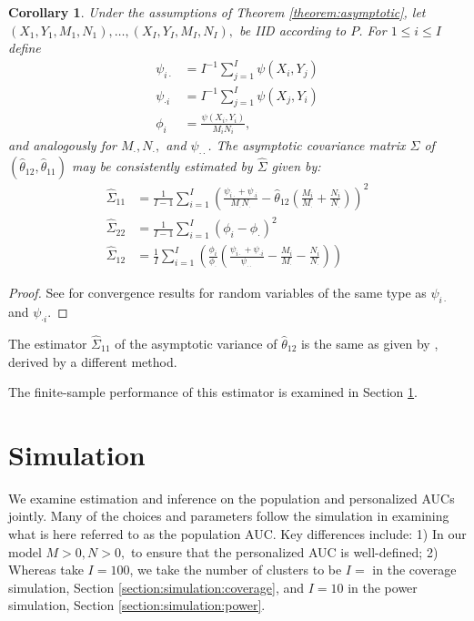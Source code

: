 \documentclass[12pt]{article}
\DeclareMathOperator{\AUC}{AUC}
\newcommand{\I}{I}
\renewcommand{\P}{P}
\newcommand{\cind}{\perp \!\!\! \perp}
\newcommand{\aucindivhat}{\hat{\theta}_{11}}%
\newcommand{\aucpophat}{\hat{\theta}_{12}}%
\newcommand{\kernel}{\psi}
\newcommand{\Kernel}{\psi}
\renewcommand{\d}{\phi}
\newtheorem{corollary}[theorem]{Corollary}
\begin{document}
\begin{corollary}\label{corollary:variance estimator}
  Under the assumptions of Theorem \ref{theorem:asymptotic}, let
  $(X_1,Y_1,M_1,N_1),\ldots,(X_\I,Y_\I,M_\I,N_\I),$ be IID according
  to $\P$. For $1\le i\le \I$ define
  \begin{align}
    \kernel_{i\cdot}&=I^{-1}\sum_{j=1}^\I \kernel(X_i,Y_j)\\
    \kernel_{\cdot i}&=I^{-1}\sum_{j=1}^\I \kernel(X_j,Y_i)\\
    \phi_i &= \frac{\kernel(X_i,Y_i)}{M_iN_i},
  \end{align}
  and analogously for $M_\cdot,N_\cdot,$ and $\kernel_{\cdot\cdot}$. The asymptotic covariance matrix
  $\Sigma$ of $(\aucpophat,\aucindivhat)$ may be consistently
  estimated by $\hat{\Sigma}$ given by:
  \begin{align}
    \hat{\Sigma}_{11} &=\frac{1}{\I-1}\sum_{i=1}^\I\left( \frac{\Kernel_{i\cdot}+\Kernel_{\cdot i}}{M_\cdot N_\cdot}-\aucpophat\left(\frac{M_i}{M_\cdot}+\frac{N_i}{N_\cdot}\right) \right)^2\\
    \hat{\Sigma}_{22} &= \frac{1}{\I-1}\sum_{i=1}^\I(\d_i-\d_\cdot)^2\\
    \hat{\Sigma}_{12} &=\frac{1}{\I}\sum_{i=1}^\I\left(\frac{\d_{i}}{\d_{\cdot}}\left(\frac{\Kernel_{i\cdot}+\Kernel_{\cdot i}}{\Kernel_{\cdot\cdot}} - \frac{M_i}{M_\cdot}-\frac{N_i}{N_\cdot}   \right) \right) %
  \end{align}
\end{corollary}
\begin{proof}
  See \cite{sen1960} for convergence results for random variables of the same type as $\Kernel_{i\cdot}$ and $\Kernel_{\cdot i}.$ 
\end{proof}
The estimator $\hat{\Sigma}_{11}$ of the asymptotic variance of $\aucpophat$ is the same as given by \cite{obuchowski1997}, derived by a different method.

The finite-sample performance of this estimator is examined in Section \ref{section:simulation}.



\section{Simulation}\label{section:simulation}

We examine estimation and inference on the population and personalized
AUCs jointly. Many of the choices and parameters follow the simulation
in \cite{obuchowski1997} examining what is here referred to as the
population AUC. Key differences include: 1) In our model 
$M>0,N>0,$ to ensure that the personalized AUC is well-defined; 2) Whereas
\cite{obuchowski1997} take $\I=100$, we take the number of clusters to be $\I=$ in the coverage simulation, Section \ref{section:simulation:coverage}, and $\I=10$ in the power simulation, Section \ref{section:simulation:power}.
\end{document}
